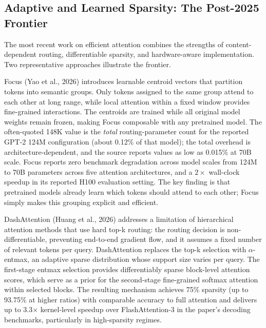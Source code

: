 \documentclass[10pt,twocolumn]{article}
\begin{document}
\subsection{Adaptive and Learned Sparsity: The Post-2025 Frontier}\label{adaptive-and-learned-sparsity-the-post-2025-frontier}

The most recent work on efficient attention combines the strengths of content-dependent routing, differentiable sparsity, and hardware-aware implementation. Two representative approaches illustrate the frontier.

Focus (Yao et al., 2026) introduces learnable centroid vectors that partition tokens into semantic groups. Only tokens assigned to the same group attend to each other at long range, while local attention within a fixed window provides fine-grained interactions. The centroids are trained while all original model weights remain frozen, making Focus composable with any pretrained model. The often-quoted 148K value is the \emph{total} routing-parameter count for the reported GPT-2 124M configuration (about 0.12\% of that model); the total overhead is architecture-dependent, and the source reports values as low as 0.015\% at 70B scale. Focus reports zero benchmark degradation across model scales from 124M to 70B parameters across five attention architectures, and a $2\times$ wall-clock speedup in its reported H100 evaluation setting. The key finding is that pretrained models already learn which tokens should attend to each other; Focus simply makes this grouping explicit and efficient.

DashAttention (Huang et al., 2026) addresses a limitation of hierarchical attention methods that use hard top-k routing: the routing decision is non-differentiable, preventing end-to-end gradient flow, and it assumes a fixed number of relevant tokens per query. DashAttention replaces the top-k selection with $\alpha$-entmax, an adaptive sparse distribution whose support size varies per query. The first-stage entmax selection provides differentiably sparse block-level attention scores, which serve as a prior for the second-stage fine-grained softmax attention within selected blocks. The resulting mechanism achieves 75\% sparsity (up to 93.75\% at higher ratios) with comparable accuracy to full attention and delivers up to 3.3$\times$ kernel-level speedup over FlashAttention-3 in the paper's decoding benchmarks, particularly in high-sparsity regimes.
\end{document}
